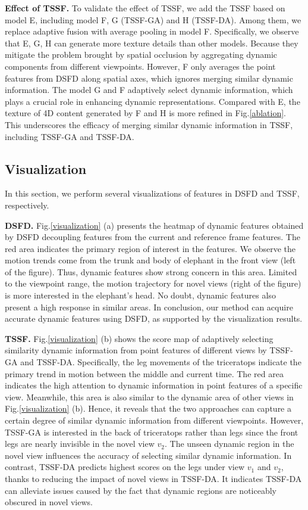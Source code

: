\textbf{Effect of TSSF.} To validate the effect of TSSF, we add the TSSF based on model E, including model F, G (TSSF-GA) and H (TSSF-DA). Among them, we replace adaptive fusion with average pooling in model F. Specifically, we observe that E, G, H can generate more texture details than other models. Because they mitigate the problem brought by spatial occlusion by aggregating dynamic components from different viewpoints. However, F only averages the point features from DSFD along spatial axes, which ignores merging similar dynamic information. The model G and F adaptively select dynamic information, which plays a crucial role in enhancing dynamic representations. Compared with E, the texture of 4D content generated by F and H is more refined in Fig.\ref{ablation}. This underscores the efficacy of merging similar dynamic information in TSSF, including TSSF-GA and TSSF-DA.


\subsection{Visualization} 
In this section, we perform several visualizations of features in DSFD and TSSF, respectively.


\textbf{DSFD.} Fig.\ref{visualization} (a) presents the heatmap of dynamic features obtained by DSFD decoupling features from the current and reference frame features. The red area indicates the primary region of interest in the features. We observe the motion trends come from the trunk and body of elephant in the front view (left of the figure). Thus, dynamic features show strong concern in this area. Limited to the viewpoint range, the motion trajectory for novel views (right of the figure) is more interested in the elephant's head. No doubt, dynamic features also present a high response in similar areas. In conclusion, our method can acquire accurate dynamic features using DSFD, as supported by the visualization results.


\textbf{TSSF.} Fig.\ref{visualization} (b) shows the score map of adaptively selecting similarity dynamic information from point features of different views by TSSF-GA and TSSF-DA.  Specifically, the leg movements of the triceratops indicate the primary trend in motion between the middle and current time. The red area indicates the high attention to dynamic information in point features of a specific view. Meanwhile, this area is also similar to the dynamic area of other views in Fig.\ref{visualization} (b). Hence, it reveals that the two approaches can capture a certain degree of similar dynamic information from different viewpoints. However, TSSF-GA is interested in the back of triceratops rather than legs since the front legs are nearly invisible in the novel view $v_2$. The unseen dynamic region in the novel view influences the accuracy of selecting similar dynamic information. In contrast, TSSF-DA predicts highest scores on the legs under view $v_1$ and $v_2$, thanks to reducing the impact of novel views in TSSF-DA. It indicates TSSF-DA can alleviate issues caused by the fact that dynamic regions are noticeably obscured in novel views.
